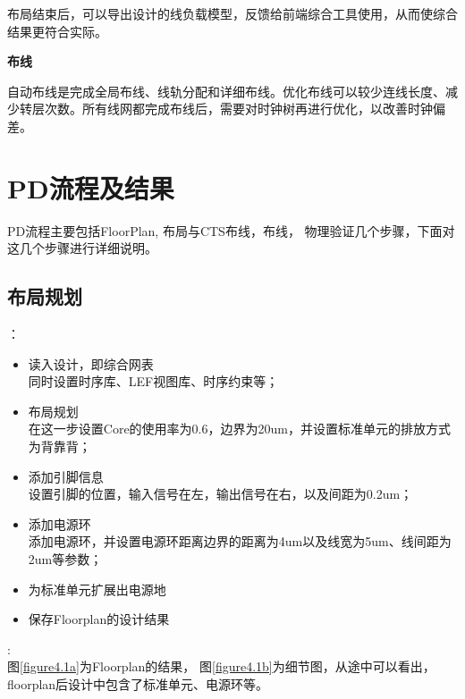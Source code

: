 \documentclass[a4paper,12pt]{report}
\begin{document}
布局结束后，可以导出设计的线负载模型，反馈给前端综合工具使用，从而使综合结果更符合实际。


\noindent \textbf{布线}

自动布线是完成全局布线、线轨分配和详细布线。优化布线可以较少连线长度、减少转层次数。所有线网都完成布线后，需要对时钟树再进行优化，以改善时钟偏差。	
	
\section{PD流程及结果}
PD流程主要包括FloorPlan, 布局与CTS布线，布线， 物理验证几个步骤，下面对这几个步骤进行详细说明。 
\subsection{布局规划}
：
\begin{itemize}
\item 读入设计，即综合网表\\
	同时设置时序库、LEF视图库、时序约束等；
\item 布局规划\\
	在这一步设置Core的使用率为0.6，边界为20um，并设置标准单元的排放方式为背靠背；
\item 添加引脚信息\\
	设置引脚的位置，输入信号在左，输出信号在右，以及间距为0.2um；
\item 添加电源环\\
	添加电源环，并设置电源环距离边界的距离为4um以及线宽为5um、线间距为2um等参数；
\item 为标准单元扩展出电源地
\item 保存Floorplan的设计结果
\end{itemize}
:\\
\indent 图\ref{figure4.1a}为Floorplan的结果， 图\ref{figure4.1b}为细节图，从途中可以看出，floorplan后设计中包含了标准单元、电源环等。
\end{document}

